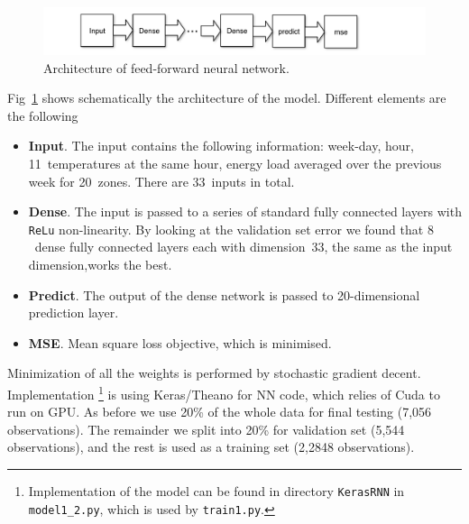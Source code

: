 \documentclass{article} %
\begin{document}
\begin{figure}[h]
\begin{center}
\includegraphics[width=0.70\linewidth]{energy_NN_diag.pdf}	
\end{center}
\caption{Architecture of feed-forward neural network.}
\label{fig:energy/nn_diag}
\end{figure}
Fig~\ref{fig:energy/nn_diag} shows schematically the architecture of the model.
Different elements are the following
\begin{itemize}
	\item {\bf Input}.
	The input contains the following information: week-day, hour, 11~temperatures
	at the same hour, energy load averaged over the previous week 
	for 20~zones. There are 33~inputs in total.
	\item {\bf Dense}. 
	The input is passed to a series of standard fully connected layers with
	{\tt ReLu} non-linearity. By looking at the validation set error
	we found that $8$~dense fully connected layers each with dimension~33,
	the same as the input dimension,works the best.
	\item {\bf Predict}.
	The output of the dense network is passed to 20-dimensional 
	prediction layer.
	\item {\bf MSE}.
	Mean square loss objective, which is minimised. 
\end{itemize}
Minimization of all the weights is performed by
stochastic gradient decent.
Implementation%
\footnote{
Implementation of the model can be found in directory {\tt KerasRNN}
in {\tt model1\_2.py}, which is used by {\tt train1.py}.
} is using Keras/Theano for NN code, which relies of Cuda to run
on GPU.
As before we use 20\% of the whole data for final testing (7,056 observations). 
The remainder we split into 20\% for validation set (5,544 observations), 
and the rest is used as a training set (2,2848 observations).
\end{document}
